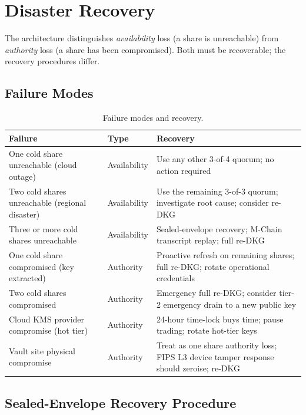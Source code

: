 \section{Disaster Recovery}

\label{sec:dr}

The architecture distinguishes \emph{availability} loss (a share is
unreachable) from \emph{authority} loss (a share has been compromised).
Both must be recoverable; the recovery procedures differ.

\subsection{Failure Modes}

\begin{table}[h]
\centering
\small
\begin{tabular}{p{4cm}p{4cm}p{6cm}}
\toprule
\textbf{Failure} & \textbf{Type} & \textbf{Recovery} \\
\midrule
One cold share unreachable (cloud outage) &
Availability &
Use any other 3-of-4 quorum; no action required \\
Two cold shares unreachable (regional disaster) &
Availability &
Use the remaining 3-of-3 quorum; investigate root cause; consider
re-DKG \\
Three or more cold shares unreachable &
Availability &
Sealed-envelope recovery; M-Chain transcript replay; full re-DKG \\
One cold share compromised (key extracted) &
Authority &
Proactive refresh on remaining shares; full re-DKG; rotate
operational credentials \\
Two cold shares compromised &
Authority &
Emergency full re-DKG; consider tier-2 emergency drain to a new
public key \\
Cloud KMS provider compromise (hot tier) &
Authority &
24-hour time-lock buys time; pause trading; rotate hot-tier keys \\
Vault site physical compromise &
Authority &
Treat as one share authority loss; FIPS L3 device tamper response
should zeroise; re-DKG \\
\bottomrule
\end{tabular}
\caption{Failure modes and recovery.}
\label{tab:failures}
\end{table}

\subsection{Sealed-Envelope Recovery Procedure}

